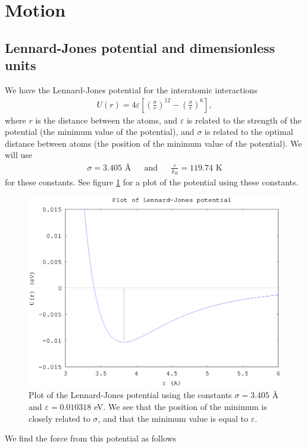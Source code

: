 \section*{Motion}
\subsection*{Lennard-Jones potential and dimensionless units}
We have the Lennard-Jones potential for the interatomic interactions
\begin{align}
    U(r) = 4\varepsilon \left[ \left(\frac{\sigma}{r}\right)^{12} - \left(\frac{\sigma}{r}\right)^6 \right], \label{eq:LJ}
\end{align}
where $r$ is the distance between the atoms, and $\varepsilon$ is related to the strength of the potential (the minimum value of the potential), and $\sigma$ is related to the optimal distance between atoms (the position of the minimum value of the potential). We will use 
\begin{align*}
    &\sigma = 3.405 \text{ \AA}& &\text{and}& &\frac{\varepsilon}{k_B} = 119.74 \text{ K}&
\end{align*}
for these constants. See figure \ref{fig:LJ} for a plot of the potential using these constants.
\begin{figure}[h!]
    \centering
    \includegraphics[width =.70\textwidth]{bilder/LJ_plot01.eps}
    \parbox{4in} {
        \caption{
            \small{
                Plot of the Lennard-Jones potential using the constants $\sigma = 3.405$ {\AA} and $\varepsilon = 0.010318$ eV. We see that the position of the minimum is closely related to $\sigma$, and that the minimum value is equal to $\varepsilon$.
            }
            \label{fig:LJ}
        }
    }
\end{figure}
We find the force from this potential as follows
